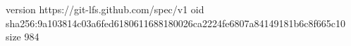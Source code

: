 version https://git-lfs.github.com/spec/v1
oid sha256:9a103814c03a6fed6180611688180026ca2224fe6807a84149181b6c8f665c10
size 984
